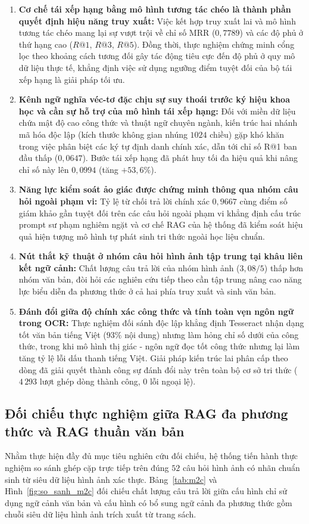 \begin{enumerate}
    \item \textbf{Cơ chế tái xếp hạng bằng mô hình tương tác chéo là thành phần quyết định hiệu năng truy xuất:} Việc kết hợp truy xuất lai và mô hình tương tác chéo mang lại sự vượt trội về chỉ số MRR ($0{,}7789$) và các độ phủ ở thứ hạng cao ($R@1$, $R@3$, $R@5$). Đồng thời, thực nghiệm chứng minh cổng lọc theo khoảng cách tương đối gây tác động tiêu cực đến độ phủ ở quy mô dữ liệu thực tế, khẳng định việc sử dụng ngưỡng điểm tuyệt đối của bộ tái xếp hạng là giải pháp tối ưu.
    \item \textbf{Kênh ngữ nghĩa véc-tơ đặc chịu sự suy thoái trước ký hiệu khoa học và cần sự hỗ trợ của mô hình tái xếp hạng:} Đối với miền dữ liệu chứa mật độ cao công thức và thuật ngữ chuyên ngành, kiến trúc hai nhánh mã hóa độc lập (kích thước không gian nhúng $1024$ chiều) gặp khó khăn trong việc phân biệt các ký tự định danh chính xác, dẫn tới chỉ số R@1 ban đầu thấp ($0{,}0647$). Bước tái xếp hạng đã phát huy tối đa hiệu quả khi nâng chỉ số này lên $0{,}0994$ (tăng $+53{,}6\%$).
    \item \textbf{Năng lực kiểm soát ảo giác được chứng minh thông qua nhóm câu hỏi ngoài phạm vi:} Tỷ lệ từ chối trả lời chính xác $0{,}9667$ cùng điểm số giám khảo gần tuyệt đối trên các câu hỏi ngoài phạm vi khẳng định cấu trúc prompt sư phạm nghiêm ngặt và cơ chế RAG của hệ thống đã kiểm soát hiệu quả hiện tượng mô hình tự phát sinh tri thức ngoài học liệu chuẩn.
    \item \textbf{Nút thắt kỹ thuật ở nhóm câu hỏi hình ảnh tập trung tại khâu liên kết ngữ cảnh:} Chất lượng câu trả lời của nhóm hình ảnh ($3{,}08/5$) thấp hơn nhóm văn bản, đòi hỏi các nghiên cứu tiếp theo cần tập trung nâng cao năng lực biểu diễn đa phương thức ở cả hai phía truy xuất và sinh văn bản.
    \item \textbf{Đánh đổi giữa độ chính xác công thức và tính toàn vẹn ngôn ngữ trong OCR:} Thực nghiệm đối sánh độc lập khẳng định Tesseract nhận dạng tốt văn bản tiếng Việt ($93\%$ nội dung) nhưng làm hỏng chỉ số dưới của công thức, trong khi mô hình thị giác - ngôn ngữ đọc tốt công thức nhưng lại làm tăng tỷ lệ lỗi dấu thanh tiếng Việt. Giải pháp kiến trúc lai phân cấp theo dòng đã giải quyết thành công sự đánh đổi này trên toàn bộ cơ sở tri thức ($4\,293$ lượt ghép dòng thành công, $0$ lỗi ngoại lệ).
\end{enumerate}

\subsection{Đối chiếu thực nghiệm giữa RAG đa phương thức và RAG thuần văn bản}
\label{sec:mm}
Nhằm thực hiện đầy đủ mục tiêu nghiên cứu đối chiếu, hệ thống tiến hành thực nghiệm so sánh ghép cặp trực tiếp trên đúng $52$ câu hỏi hình ảnh có nhãn chuẩn sinh từ siêu dữ liệu hình ảnh xác thực. Bảng~\ref{tab:m2c} và Hình~\ref{fig:so_sanh_m2c} đối chiếu chất lượng câu trả lời giữa cấu hình chỉ sử dụng ngữ cảnh văn bản và cấu hình có bổ sung ngữ cảnh đa phương thức gồm chuỗi siêu dữ liệu hình ảnh trích xuất từ trang sách.

